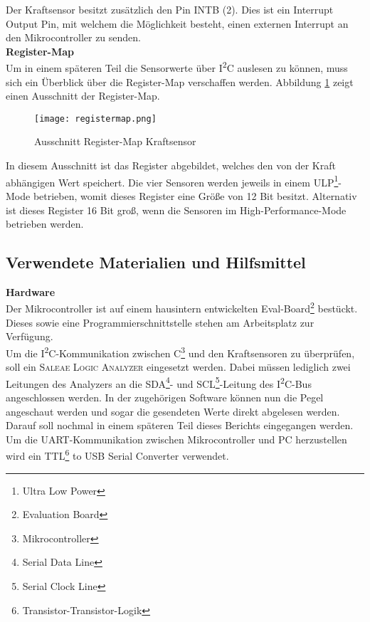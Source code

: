 \documentclass[
	letterpaper, %
	10pt, %
]{CSUniSchoolLabReport}
\begin{document}
\begin{spacing}{1.6}
Der Kraftsensor besitzt zusätzlich den Pin INTB (2). Dies ist ein Interrupt Output Pin, mit welchem die Möglichkeit besteht, einen externen Interrupt an den Mikrocontroller zu senden.\\

\textbf{Register-Map\\}
Um in einem späteren Teil die Sensorwerte über I\textsuperscript{2}C auslesen zu können, muss sich ein Überblick über die Register-Map verschaffen werden. Abbildung \ref{fig:registermap} zeigt einen Ausschnitt der Register-Map.

\begin{figure}[H]
    \centering
    \texttt{[image: registermap.png]}
    \caption{Ausschnitt Register-Map Kraftsensor}
    \label{fig:registermap}
\end{figure}

In diesem Ausschnitt ist das Register abgebildet, welches den von der Kraft abhängigen Wert speichert. Die vier Sensoren werden jeweils in einem ULP\footnote{Ultra Low Power}-Mode betrieben, womit dieses Register eine Größe von 12 Bit besitzt. Alternativ ist dieses Register 16 Bit groß, wenn die Sensoren im High-Performance-Mode betrieben werden.\\

\subsection{Verwendete Materialien und Hilfsmittel}
\textbf{Hardware\\}
Der Mikrocontroller ist auf einem hausintern entwickelten Eval-Board\footnote{Evaluation Board} bestückt. Dieses sowie eine Programmierschnittstelle stehen am Arbeitsplatz zur Verfügung.\\

Um die I\textsuperscript{2}C-Kommunikation zwischen \textmu C\footnote{Mikrocontroller} und den Kraftsensoren zu überprüfen, soll ein \textsc{Saleae Logic Analyzer} eingesetzt werden. Dabei müssen lediglich zwei Leitungen des Analyzers an die SDA\footnote{Serial Data Line}- und SCL\footnote{Serial Clock Line}-Leitung des I\textsuperscript{2}C-Bus angeschlossen werden. In der zugehörigen Software können nun die Pegel angeschaut werden und sogar die gesendeten Werte direkt abgelesen werden. Darauf soll nochmal in einem späteren Teil dieses Berichts eingegangen werden. Um die UART-Kommunikation zwischen Mikrocontroller und PC herzustellen wird ein TTL\footnote{Transistor-Transistor-Logik} to USB Serial Converter verwendet.\\


\end{spacing}
\end{document}
